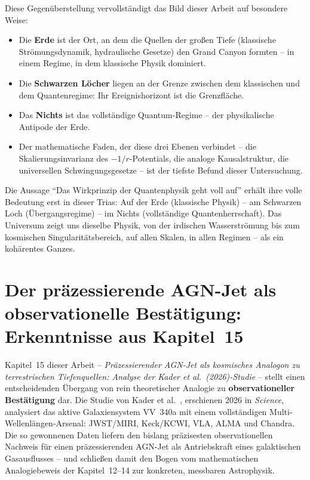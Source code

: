 ﻿\documentclass[12pt,a4paper]{report}
\begin{document}
Diese Gegenüberstellung vervollständigt das Bild dieser Arbeit auf besondere Weise:
\begin{itemize}
    \item Die \textbf{Erde} ist der Ort, an dem die Quellen der großen Tiefe (klassische Strömungs\-dynamik, hydraulische Gesetze) den Grand Canyon formten -- in einem Regime, in dem klassische Physik dominiert.
    \item Die \textbf{Schwarzen Löcher} liegen an der Grenze zwischen dem klassischen und dem Quantenregime: Ihr Ereignishorizont ist die Grenzfläche.
    \item Das \textbf{Nichts} ist das vollständige Quantum-Regime -- der physikalische Antipode der Erde.
    \item Der mathematische Faden, der diese drei Ebenen verbindet -- die Skalierungsinvarianz des $-1/r$-Potentials, die analoge Kausalstruktur, die universellen Schwingungsgesetze -- ist der tiefste Befund dieser Untersuchung.
\end{itemize}

Die Aussage "`Das Wirkprinzip der Quantenphysik geht voll auf"' erhält ihre volle Bedeutung erst in dieser Trias: Auf der Erde (klassische Physik) -- am Schwarzen Loch (Übergangsregime) -- im Nichts (vollständige Quantenherrschaft). Das Universum zeigt uns dieselbe Physik, von der irdischen Wasserströmung bis zum kosmischen Singularitätsbereich, auf allen Skalen, in allen Regimen -- als ein kohärentes Ganzes.

\section{Der präzessierende AGN-Jet als observationelle Bestätigung: Erkenntnisse aus Kapitel~15}
\label{sec:zusammenfassung_agn}

Kapitel~15 dieser Arbeit -- \textit{Präzessierender AGN-Jet als kosmisches Analogon zu terrestrischen Tiefenquellen: Analyse der Kader et al.\ (2026)-Studie} -- stellt einen entscheidenden Übergang von rein theoretischer Analogie zu \textbf{observationeller Bestätigung} dar. Die Studie von Kader et al.\ \cite{kader2026}, erschienen 2026 in \textit{Science}, analysiert das aktive Galaxiensystem VV~340a mit einem vollständigen Multi-Wellenlängen-Arsenal: JWST/MIRI, Keck/KCWI, VLA, ALMA und Chandra. Die so gewonnenen Daten liefern den bislang präzisesten observationellen Nachweis für einen präzessierenden AGN-Jet als Antriebskraft eines galaktischen Gasausflusses -- und schließen damit den Bogen vom mathematischen Analogiebeweis der Kapitel~12--14 zur konkreten, messbaren Astrophysik.
\end{document}
